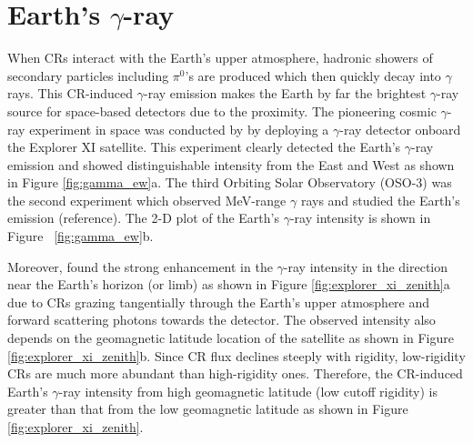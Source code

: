 \section{Earth's $\gamma$-ray}

When CRs interact with the Earth's upper atmosphere, hadronic
showers of secondary particles including $\pi^0$'s are produced
which then quickly decay into $\gamma$ rays.
This CR-induced $\gamma$-ray emission makes the Earth by far
the brightest $\gamma$-ray source for space-based detectors due
to the proximity. The pioneering cosmic $\gamma$-ray experiment
in space was conducted by \cite{kraushaar1965explorer} by deploying
a $\gamma$-ray detector onboard the Explorer XI satellite. 
This experiment clearly detected the Earth's $\gamma$-ray emission
and showed distinguishable intensity from the East and West as shown
in Figure \ref{fig:gamma_ew}a.
The third Orbiting Solar Observatory (OSO-3) was the second experiment 
which observed MeV-range $\gamma$ rays and studied the Earth's
emission (reference).
The 2-D plot of the Earth's $\gamma$-ray intensity
is shown in Figure ~\ref{fig:gamma_ew}b.

Moreover, \cite{kraushaar1965explorer} found the strong enhancement
in the $\gamma$-ray intensity in the direction near
the Earth's horizon (or limb) as shown in Figure \ref{fig:explorer_xi_zenith}a
due to CRs grazing tangentially through the Earth's upper atmosphere
and forward scattering photons towards the detector.
The observed intensity also depends on the geomagnetic
latitude location of the satellite as shown
in Figure \ref{fig:explorer_xi_zenith}b.
Since CR flux declines steeply with rigidity, low-rigidity CRs
are much more abundant than high-rigidity ones.
Therefore, the CR-induced Earth's $\gamma$-ray intensity
from high geomagnetic latitude (low cutoff rigidity) is
greater than that from the low geomagnetic latitude
as shown in Figure \ref{fig:explorer_xi_zenith}.

